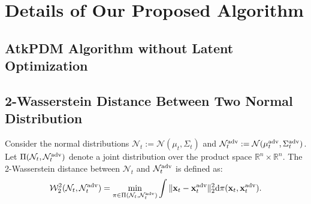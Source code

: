 \section{Details of Our Proposed Algorithm}

\subsection{AtkPDM Algorithm without Latent Optimization}


\subsection{2-Wasserstein Distance Between Two Normal Distribution}
Consider the normal distributions $\mathcal{N}_t:=\mathcal{N}(\mu_t, \Sigma_t)$ and $\mathcal{N}_t^{\adv}:=\mathcal{N}(\mu_t^{\adv}, \Sigma_t^{\adv})$. Let $\Pi(\mathcal{N}_t, \mathcal{N}_t^{\adv})$ denote a joint distribution over the product space $\mathbb{R}^n \times \mathbb{R}^n$. The 2-Wasserstein distance between $\mathcal{N}_t$ and $\mathcal{N}_t^{\adv}$ is defined as:
\begin{align*}
    \mathcal{W}_2^2(\mathcal{N}_t, \mathcal{N}_t^{\adv})
    =\min_{\pi \in \Pi(\mathcal{N}_t, \mathcal{N}_t^{\adv})} \int \|\mathbf{x}_t-\mathbf{x}_t^{\adv}\|_2^2 \text{d}\pi(\mathbf{x}_t, \mathbf{x}_t^{\adv}).
\end{align*}

